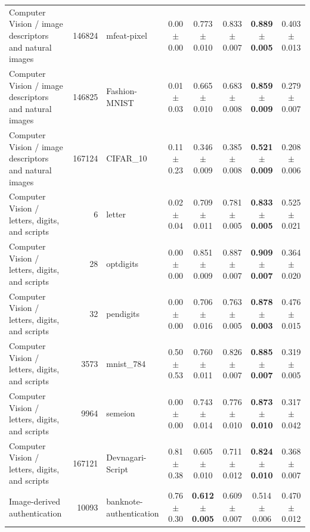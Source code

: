 \begin{table}[!tbp]
\begin{tabular}{lrlccccc}
        Computer Vision / image descriptors and natural images & 146824 & mfeat-pixel & 0.00 $\pm$ 0.00 & 0.773 $\pm$ 0.010 & 0.833 $\pm$ 0.007 & \textbf{0.889 $\pm$ 0.005} & 0.403 $\pm$ 0.013 \\
        Computer Vision / image descriptors and natural images & 146825 & Fashion-MNIST & 0.01 $\pm$ 0.03 & 0.665 $\pm$ 0.010 & 0.683 $\pm$ 0.008 & \textbf{0.859 $\pm$ 0.009} & 0.279 $\pm$ 0.007 \\
        Computer Vision / image descriptors and natural images & 167124 & CIFAR\_10 & 0.11 $\pm$ 0.23 & 0.346 $\pm$ 0.009 & 0.385 $\pm$ 0.008 & \textbf{0.521 $\pm$ 0.009} & 0.208 $\pm$ 0.006 \\
        Computer Vision / letters, digits, and scripts & 6 & letter & 0.02 $\pm$ 0.04 & 0.709 $\pm$ 0.011 & 0.781 $\pm$ 0.005 & \textbf{0.833 $\pm$ 0.005} & 0.525 $\pm$ 0.021 \\
        Computer Vision / letters, digits, and scripts & 28 & optdigits & 0.00 $\pm$ 0.00 & 0.851 $\pm$ 0.009 & 0.887 $\pm$ 0.007 & \textbf{0.909 $\pm$ 0.007} & 0.364 $\pm$ 0.020 \\
        Computer Vision / letters, digits, and scripts & 32 & pendigits & 0.00 $\pm$ 0.00 & 0.706 $\pm$ 0.016 & 0.763 $\pm$ 0.005 & \textbf{0.878 $\pm$ 0.003} & 0.476 $\pm$ 0.015 \\
        Computer Vision / letters, digits, and scripts & 3573 & mnist\_784 & 0.50 $\pm$ 0.53 & 0.760 $\pm$ 0.011 & 0.826 $\pm$ 0.007 & \textbf{0.885 $\pm$ 0.007} & 0.319 $\pm$ 0.005 \\
        Computer Vision / letters, digits, and scripts & 9964 & semeion & 0.00 $\pm$ 0.00 & 0.743 $\pm$ 0.014 & 0.776 $\pm$ 0.010 & \textbf{0.873 $\pm$ 0.010} & 0.317 $\pm$ 0.042 \\
        Computer Vision / letters, digits, and scripts & 167121 & Devnagari-Script & 0.81 $\pm$ 0.38 & 0.605 $\pm$ 0.010 & 0.711 $\pm$ 0.012 & \textbf{0.824 $\pm$ 0.010} & 0.368 $\pm$ 0.007 \\
        Image-derived authentication & 10093 & banknote-authentication & 0.76 $\pm$ 0.30 & \textbf{0.612 $\pm$ 0.005} & 0.609 $\pm$ 0.007 & 0.514 $\pm$ 0.006 & 0.470 $\pm$ 0.012 \\
        \bottomrule
    \end{tabular}%
\end{table}


